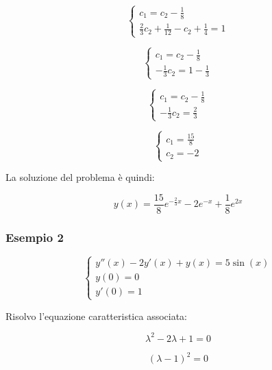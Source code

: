 \begin{equation*}
    \begin{cases*}
        c_1=c_2-\frac{1}{8} \\
        \frac{2}{3}c_2+\frac{1}{12}-c_2+\frac{1}{4}=1
    \end{cases*}
\end{equation*}


\begin{equation*}
    \begin{cases*}
        c_1=c_2-\frac{1}{8} \\
        -\frac{1}{3}c_2= 1- \frac{1}{3}
    \end{cases*}
\end{equation*}

\begin{equation*}
    \begin{cases*}
        c_1=c_2-\frac{1}{8} \\
        -\frac{1}{3}c_2=\frac{2}{3}
    \end{cases*}
\end{equation*}

\begin{equation*}
    \begin{cases*}
        c_1=\frac{15}{8} \\
        c_2=-2
    \end{cases*}
\end{equation*}

La soluzione del problema è quindi:

\[
    y(x) = \frac{15}{8}e ^{-\frac{2}{3}x}- 2 e ^{-x}+ \frac{1}{8}e ^{2x}
\]

\filbreak{}
\subsubsection*{Esempio 2}

\begin{equation*}
    \begin{cases*}
        y''(x) -2y'(x)+ y(x) = 5\sin(x) \\
        y(0) = 0                        \\
        y'(0) = 1
    \end{cases*}
\end{equation*}


Risolvo l'equazione caratteristica associata:

\[
    \lambda^{2}-2 \lambda + 1=0
\]

\[
    {(\lambda-1)}^{2}=0
\]

